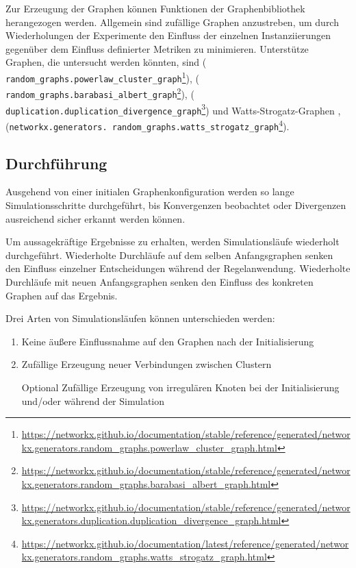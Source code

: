 \documentclass[11pt, a4paper]{scrartcl}
\newcommand{\nx}[1]{\texttt{#1}}
\begin{document}
Zur Erzeugung der Graphen können Funktionen der Graphenbibliothek \autocite{networkx} herangezogen werden. Allgemein sind zufällige Graphen anzustreben, um durch Wiederholungen der Experimente den Einfluss der einzelnen Instanziierungen gegenüber dem Einfluss definierter Metriken zu minimieren.
Unterstütze Graphen, die untersucht werden könnten, sind \autocite{Holme2002} (\nx{%
random\_graphs.powerlaw\_cluster\_graph}\footnote{\url{https://networkx.github.io/documentation/stable/reference/generated/networkx.generators.random_graphs.powerlaw_cluster_graph.html}}), \autocite{Barabasi509} (\nx{%
random\_graphs.barabasi\_albert\_graph}\footnote{\url{https://networkx.github.io/documentation/stable/reference/generated/networkx.generators.random_graphs.barabasi_albert_graph.html}}), \autocite{Ispolatov2005} (\nx{%
duplication.duplication\_divergence\_graph}\footnote{\url{https://networkx.github.io/documentation/stable/reference/generated/networkx.generators.duplication.duplication_divergence_graph.html}}) und Watts-Strogatz-Graphen \autocite{Watts1998}, \autocite{Newman1999} (\nx{networkx.generators.%
random\_graphs.watts\_strogatz\_graph}\footnote{\url{https://networkx.github.io/documentation/latest/reference/generated/networkx.generators.random_graphs.watts_strogatz_graph.html}}).

\subsection{Durchführung}
Ausgehend von einer initialen Graphenkonfiguration werden so lange Simulationsschritte durchgeführt, bis Konvergenzen beobachtet oder Divergenzen ausreichend sicher erkannt werden können.

Um aussagekräftige Ergebnisse zu erhalten, werden Simulationsläufe wiederholt durchgeführt. Wiederholte Durchläufe auf dem selben Anfangsgraphen senken den Einfluss einzelner Entscheidungen während der Regelanwendung. Wiederholte Durchläufe mit neuen Anfangsgraphen senken den Einfluss des konkreten Graphen auf das Ergebnis.

Drei Arten von Simulationsläufen können unterschieden werden:
\begin{enumerate}
\item Keine äußere Einflussnahme auf den Graphen nach der Initialisierung
\item Zufällige Erzeugung neuer Verbindungen zwischen Clustern
\item [Optional] Zufällige Erzeugung von irregulären Knoten bei der Initialisierung und/oder während der Simulation
\end{enumerate}
\end{document}
